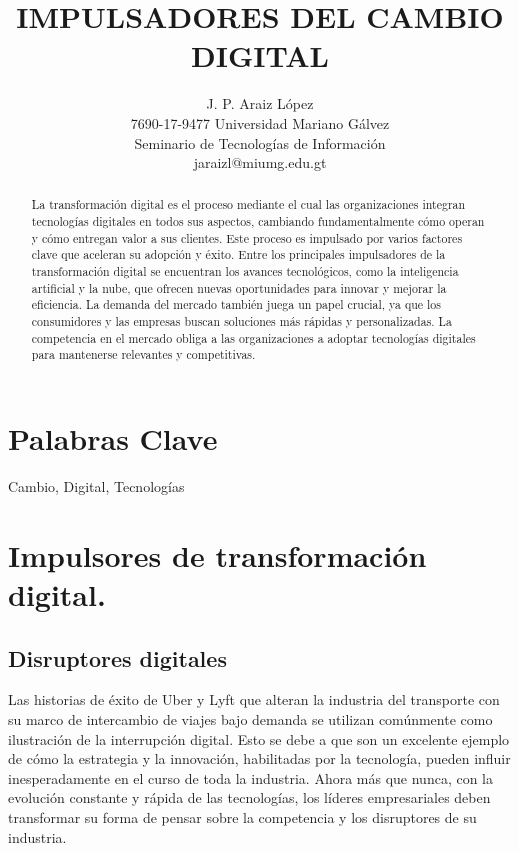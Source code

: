 \documentclass[12pt]{article}
\title{IMPULSADORES DEL CAMBIO DIGITAL}
\author{J. P. Araiz López\\
  \small 7690-17-9477 Universidad Mariano Gálvez\\
  \small Seminario de Tecnologías de Información\\
  \small jaraizl@miumg.edu.gt
}
\begin{document}
\maketitle

\begin{abstract}
La transformación digital es el proceso mediante el cual las organizaciones integran tecnologías digitales en todos sus aspectos, cambiando fundamentalmente cómo operan y cómo entregan valor a sus clientes. Este proceso es impulsado por varios factores clave que aceleran su adopción y éxito. Entre los principales impulsadores de la transformación digital se encuentran los avances tecnológicos, como la inteligencia artificial y la nube, que ofrecen nuevas oportunidades para innovar y mejorar la eficiencia. La demanda del mercado también juega un papel crucial, ya que los consumidores y las empresas buscan soluciones más rápidas y personalizadas. La competencia en el mercado obliga a las organizaciones a adoptar tecnologías digitales para mantenerse relevantes y competitivas.

\end{abstract}
\maketitle{}


\section*{Palabras Clave}
Cambio, Digital, Tecnologías 

\section*{Impulsores de transformación digital.}

\subsection*{Disruptores digitales}
Las historias de éxito de Uber y Lyft que alteran la industria del transporte con su marco de intercambio de viajes bajo demanda se utilizan comúnmente como ilustración de la interrupción digital. Esto se debe a que son un excelente ejemplo de cómo la estrategia y la innovación, habilitadas por la tecnología, pueden influir inesperadamente en el curso de toda la industria. Ahora más que nunca, con la evolución constante y rápida de las tecnologías, los líderes empresariales deben transformar su forma de pensar sobre la competencia y los disruptores de su industria.
\end{document}
